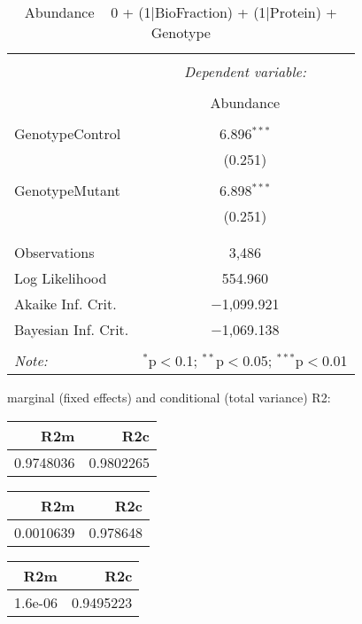 \documentclass[11pt]{report}
\begin{document}
\begin{table}[!htbp] \centering 
  \caption{Abundance ~ 0 + (1|BioFraction) + (1|Protein) + Genotype} 
  \label{} 
\begin{tabular}{@{\extracolsep{5pt}}lc} 
\\[-1.8ex]\hline 
\hline \\[-1.8ex] 
 & \multicolumn{1}{c}{\textit{Dependent variable:}} \\ 
\cline{2-2} 
\\[-1.8ex] & Abundance \\ 
\hline \\[-1.8ex] 
 GenotypeControl & 6.896$^{***}$ \\ 
  & (0.251) \\ 
  & \\ 
 GenotypeMutant & 6.898$^{***}$ \\ 
  & (0.251) \\ 
  & \\ 
\hline \\[-1.8ex] 
Observations & 3,486 \\ 
Log Likelihood & 554.960 \\ 
Akaike Inf. Crit. & $-$1,099.921 \\ 
Bayesian Inf. Crit. & $-$1,069.138 \\ 
\hline 
\hline \\[-1.8ex] 
\textit{Note:}  & \multicolumn{1}{r}{$^{*}$p$<$0.1; $^{**}$p$<$0.05; $^{***}$p$<$0.01} \\ 
\end{tabular} 
\end{table} 
marginal (fixed effects) and conditional (total variance) R2:

\begin{tabular}{r|r}
\hline
R2m & R2c\\
\hline
0.9748036 & 0.9802265\\
\hline
\end{tabular}

\begin{tabular}{r|r}
\hline
R2m & R2c\\
\hline
0.0010639 & 0.978648\\
\hline
\end{tabular}

\begin{tabular}{r|r}
\hline
R2m & R2c\\
\hline
1.6e-06 & 0.9495223\\
\hline
\end{tabular}
\end{document}
